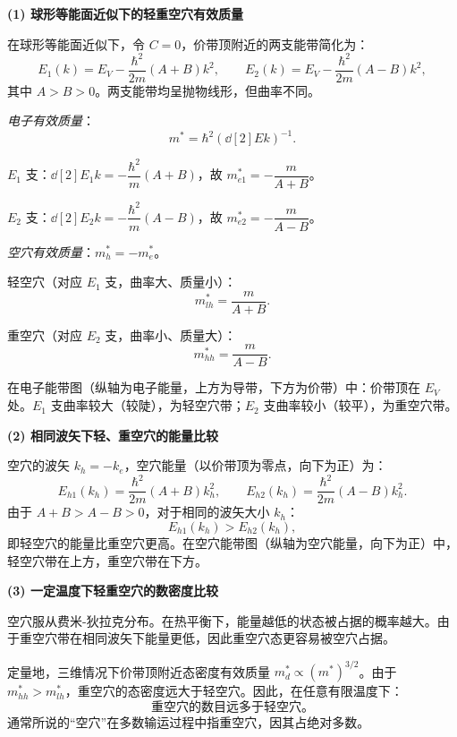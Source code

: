 \begin{derivationbox}[标准解题过程]
\textbf{(1) 球形等能面近似下的轻重空穴有效质量}

在球形等能面近似下，令 $C=0$，价带顶附近的两支能带简化为：
\[
E_1(k)=E_V-\frac{\hbar^2}{2m}(A+B)k^2,\qquad
E_2(k)=E_V-\frac{\hbar^2}{2m}(A-B)k^2,
\]
其中 $A>B>0$。两支能带均呈抛物线形，但曲率不同。

\textit{电子有效质量}：
\[
m^*=\hbar^2\left(\dd[2]{E}{k}\right)^{-1}.
\]

$E_1$ 支：$\dd[2]{E_1}{k}=-\dfrac{\hbar^2}{m}(A+B)$，故 $m_{e1}^*=-\dfrac{m}{A+B}$。

$E_2$ 支：$\dd[2]{E_2}{k}=-\dfrac{\hbar^2}{m}(A-B)$，故 $m_{e2}^*=-\dfrac{m}{A-B}$。

\textit{空穴有效质量}：$m_h^*=-m_e^*$。

轻空穴（对应 $E_1$ 支，曲率大、质量小）：
\begin{equation}
\boxed{m_{lh}^*=\frac{m}{A+B}.}
\end{equation}

重空穴（对应 $E_2$ 支，曲率小、质量大）：
\begin{equation}
\boxed{m_{hh}^*=\frac{m}{A-B}.}
\end{equation}

在电子能带图（纵轴为电子能量，上方为导带，下方为价带）中：价带顶在 $E_V$ 处。$E_1$ 支曲率较大（较陡），为轻空穴带；$E_2$ 支曲率较小（较平），为重空穴带。

\textbf{(2) 相同波矢下轻、重空穴的能量比较}

空穴的波矢 $k_h=-k_e$，空穴能量（以价带顶为零点，向下为正）为：
\[
E_{h1}(k_h)=\frac{\hbar^2}{2m}(A+B)k_h^2,\qquad
E_{h2}(k_h)=\frac{\hbar^2}{2m}(A-B)k_h^2.
\]
由于 $A+B>A-B>0$，对于相同的波矢大小 $k_h$：
\begin{equation}
\boxed{E_{h1}(k_h)>E_{h2}(k_h),}
\end{equation}
即轻空穴的能量比重空穴更高。在空穴能带图（纵轴为空穴能量，向下为正）中，轻空穴带在上方，重空穴带在下方。

\textbf{(3) 一定温度下轻重空穴的数密度比较}

空穴服从费米-狄拉克分布。在热平衡下，能量越低的状态被占据的概率越大。由于重空穴带在相同波矢下能量更低，因此重空穴态更容易被空穴占据。

定量地，三维情况下价带顶附近态密度有效质量 $m_d^*\propto (m^*)^{3/2}$。由于 $m_{hh}^*>m_{lh}^*$，重空穴的态密度远大于轻空穴。因此，在任意有限温度下：
\begin{equation}
\boxed{\text{重空穴的数目远多于轻空穴。}}
\end{equation}
通常所说的``空穴''在多数输运过程中指重空穴，因其占绝对多数。
\end{derivationbox}

